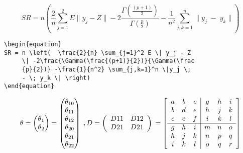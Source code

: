 \documentclass[12pt, a4paper]{article}
\begin{document}
\begin{equation}
SR = n \left(  \frac{2}{n} \sum_{j=1}^2 E \| y_j - Z \| -2\frac{\Gamma(\frac{(p+1)}{2})}{\Gamma(\frac{p}{2})} -\frac{1}{n^2} \sum_{j,k=1}^n \|y_j \; - \; y_k \| \right)
\end{equation}
\begin{lstlisting}
\begin{equation}
SR = n \left(  \frac{2}{n} \sum_{j=1}^2 E \| y_j - Z
     \| -2\frac{\Gamma(\frac{(p+1)}{2})}{\Gamma(\frac
     {p}{2})} -\frac{1}{n^2} \sum_{j,k=1}^n \|y_j \;
     - \; y_k \| \right)
\end{equation}
\end{lstlisting}

\begin{equation}
\theta = \begin{pmatrix}
            \theta_1 \\
            \theta_2 
         \end{pmatrix} 
       = \begin{pmatrix}
            \theta_{10} \\
            \theta_{11} \\
            \theta_{12} \\
            \theta_{20} \\
            \theta_{21} \\
            \theta_{22}
         \end{pmatrix} \; ,
D = \left( \begin{array}{cc}
              D11 & D12 \\
              D21 & D21
           \end{array} \right) \\
  = \begin{bmatrix}
       \begin{array}{ccc|ccc}
              a & b & c & g & h & i \\
              b & d & e & h & j & k \\
              c & e & f & i & k & l \\  \hline
              g & h & i & m & n & o \\
              h & j & k & n & p & q \\
              i & k & l & o & q & r
       \end{array}
    \end{bmatrix}
\end{equation}
\end{document}
